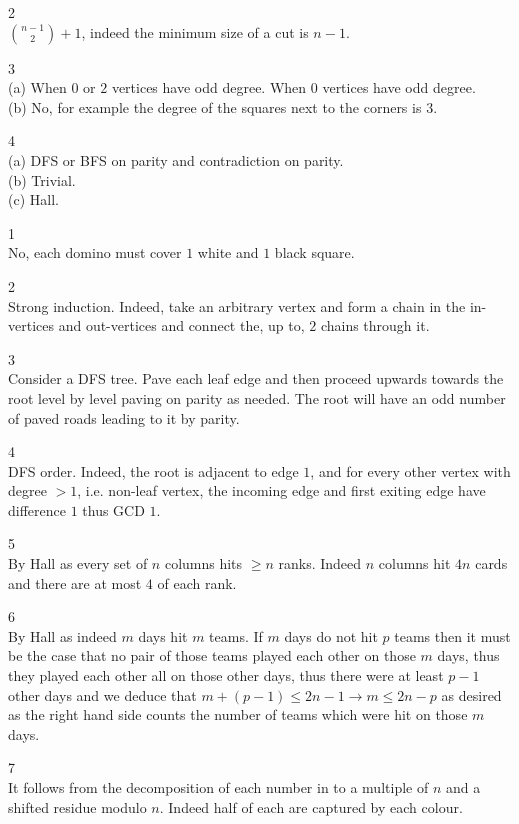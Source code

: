 2 \\
$\boxed{\binom{n-1}{2}+1}$, indeed the minimum size of a cut is $n-1$.

3 \\
(a) When $0$ or $2$ vertices have odd degree. When $0$ vertices have odd degree. \\
(b) No, for example the degree of the squares next to the corners is $3$.

4 \\
(a) DFS or BFS on parity and contradiction on parity. \\
(b) Trivial. \\
(c) Hall.

1 \\
No, each domino must cover $1$ white and $1$ black square.

2 \\
Strong induction. Indeed, take an arbitrary vertex and form a chain in the in-vertices and out-vertices and connect the, up to, $2$ chains through it.

3 \\
Consider a DFS tree. Pave each leaf edge and then proceed upwards towards the root level by level paving on parity as needed. The root will have an odd number of paved roads leading to it by parity.

4 \\
DFS order. Indeed, the root is adjacent to edge $1$, and for every other vertex with degree $>1$, i.e. non-leaf vertex, the incoming edge and first exiting edge have difference $1$ thus GCD $1$.

5 \\
By Hall as every set of $n$ columns hits $\ge n$ ranks. Indeed $n$ columns hit $4n$ cards and there are at most $4$ of each rank.

6 \\
By Hall as indeed $m$ days hit $m$ teams. If $m$ days do not hit $p$ teams then it must be the case that no pair of those teams played each other on those $m$ days, thus they played each other all on those other days, thus there were at least $p-1$ other days and we deduce that $m+(p-1) \le 2n-1 \to m \le 2n-p$ as desired as the right hand side counts the number of teams which were hit on those $m$ days.

7 \\
It follows from the decomposition of each number in to a multiple of $n$ and a shifted residue modulo $n$. Indeed half of each are captured by each colour.

\newpage

